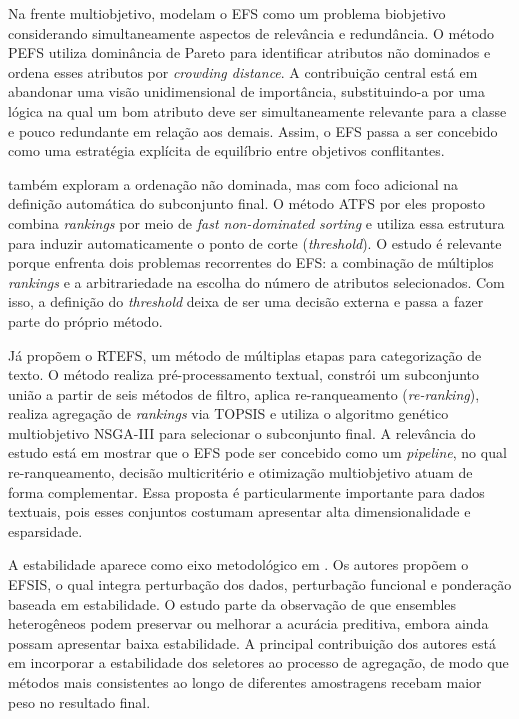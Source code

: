 Na frente multiobjetivo,  modelam o EFS como um problema biobjetivo considerando simultaneamente aspectos de relevância e redundância. O método PEFS utiliza dominância de Pareto para identificar atributos não dominados e ordena esses atributos por \textit{crowding distance}. A contribuição central está em abandonar uma visão unidimensional de importância, substituindo-a por uma lógica na qual um bom atributo deve ser simultaneamente relevante para a classe e pouco redundante em relação aos demais. Assim, o EFS passa a ser concebido como uma estratégia explícita de equilíbrio entre objetivos conflitantes.

 também exploram a ordenação não dominada, mas com foco adicional na definição automática do subconjunto final. O método ATFS por eles proposto combina \textit{rankings} por meio de \textit{fast non-dominated sorting} e utiliza essa estrutura para induzir automaticamente o ponto de corte (\textit{threshold}). O estudo é relevante porque enfrenta dois problemas recorrentes do EFS: a combinação de múltiplos \textit{rankings} e a arbitrariedade na escolha do número de atributos selecionados. Com isso, a definição do \textit{threshold} deixa de ser uma decisão externa e passa a fazer parte do próprio método.

Já  propõem o RTEFS, um método de múltiplas etapas para categorização de texto. O método realiza pré-processamento textual, constrói um subconjunto união a partir de seis métodos de filtro, aplica re-ranqueamento (\textit{re-ranking}), realiza agregação de \textit{rankings} via TOPSIS e utiliza o algoritmo genético multiobjetivo NSGA-III para selecionar o subconjunto final. A relevância do estudo está em mostrar que o EFS pode ser concebido como um \textit{pipeline}, no qual re-ranqueamento, decisão multicritério e otimização multiobjetivo atuam de forma complementar. Essa proposta é particularmente importante para dados textuais, pois esses conjuntos costumam apresentar alta dimensionalidade e esparsidade.

A estabilidade aparece como eixo metodológico em . Os autores propõem o EFSIS, o qual integra perturbação dos dados, perturbação funcional e ponderação baseada em estabilidade. O estudo parte da observação de que ensembles heterogêneos podem preservar ou melhorar a acurácia preditiva, embora ainda possam apresentar baixa estabilidade. A principal contribuição dos autores está em incorporar a estabilidade dos seletores ao processo de agregação, de modo que métodos mais consistentes ao longo de diferentes amostragens recebam maior peso no resultado final.

